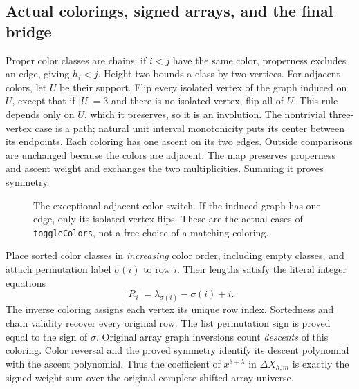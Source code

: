 \documentclass[11pt,a4paper]{article}
\theoremstyle{definition}
\begin{document}
\subsection{Actual colorings, signed arrays, and the final bridge}

Proper color classes are chains: if $i<j$ have the same color, properness
excludes an edge, giving $h_i<j$. Height two bounds a class by two vertices.
For adjacent colors, let $U$ be their support. Flip every isolated vertex
of the graph induced on $U$, except that if $|U|=3$ and there is no isolated
vertex, flip all of $U$. This rule depends only on $U$, which it preserves,
so it is an involution. The nontrivial three-vertex case is a path; natural
unit interval monotonicity puts its center between its endpoints. Each
coloring has one ascent on its two edges. Outside comparisons are unchanged
because the colors are adjacent. The map preserves properness and ascent
weight and exchanges the two multiplicities. Summing it proves symmetry.

\begin{figure}[ht]
\centering
{}
\caption{The exceptional adjacent-color switch. If the induced graph has
one edge, only its isolated vertex flips. These are the actual cases of
\texttt{toggleColors}, not a free choice of a matching coloring.}
\end{figure}

Place sorted color classes in \emph{increasing} color order, including empty
classes, and attach permutation label $\sigma(i)$ to row $i$. Their lengths
satisfy the literal integer equations
\[
 |R_i|=\lambda_{\sigma(i)}-\sigma(i)+i.
\]
The inverse coloring assigns each vertex its unique row index. Sortedness
and chain validity recover every original row. The list permutation sign
is proved equal to the sign of $\sigma$. Original array graph inversions
count \emph{descents} of this coloring. Color reversal and the proved
symmetry identify its descent polynomial with the ascent polynomial.
Thus the coefficient of $x^{\delta+\lambda}$ in $\Delta X_{h,m}$ is exactly
the signed weight sum over the original complete shifted-array universe.
\end{document}
